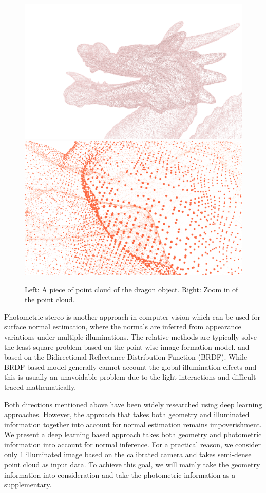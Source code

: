 \begin{figure}[h!]
	\centering
	{\includegraphics[width=.45\textwidth]{./Figures/point-cloud.png}}
	{\includegraphics[width=.45\textwidth]{./Figures/point-cloud-zoom-in.png}}
	\decoRule
	\caption{Left: A piece of point cloud of the dragon object. Right: Zoom in of the point cloud.}
	\label{fig:point-cloud}
\end{figure}

Photometric stereo is another approach in computer vision which can be used for surface normal estimation, where the normals are inferred from appearance variations under multiple illuminations. The relative methods are typically solve the least square problem based on the point-wise image formation model.\cite{SFS} and based on the Bidirectional Reflectance Distribution Function (BRDF). While BRDF based model generally cannot account the global illumination effects and this is usually an unavoidable problem due to the light interactions and difficult traced mathematically.

Both directions mentioned above have been widely researched using deep learning approaches. However, the approach that takes both geometry and illuminated information together into account for normal estimation remains impoverishment. We present a deep learning based approach takes both geometry and photometric information into account for normal inference. For a practical reason, we consider only 1 illuminated image based on the calibrated camera and takes semi-dense point cloud as input data. To achieve this goal, we will mainly take the geometry information into consideration and take the photometric information as a supplementary.

